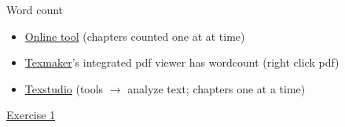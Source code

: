 \begin{frame}{Word count}
  \begin{itemize}
    \item \href{http://app.uio.no/ifi/texcount/online.php}{Online tool}
  	  (chapters counted one at at time)
    \item \href{http://www.xm1math.net/texmaker/}{Texmaker}'s integrated pdf
  	   viewer has wordcount (right click pdf)
    \item \href{https://www.texstudio.org/}{Texstudio} (tools $\rightarrow$
  	  analyze text; chapters one at a time)
  \end{itemize}
\end{frame}

\begin{frame}[standout]
  \href{https://jwalton.info/assets/teaching/latex/exercise_1.pdf}%
  {\color{white}Exercise 1}
\end{frame}
